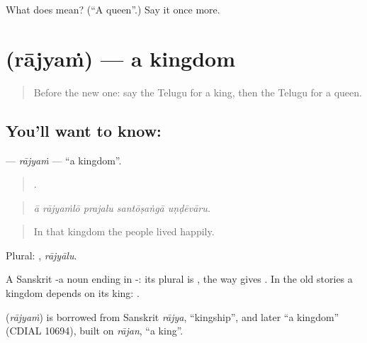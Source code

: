 \begin{tcolorbox}[breakable,colback=teal!4,colframe=teal!35!black,title={Before you move on}]
What does  mean? (\textquotedblleft{}A queen\textquotedblright{}.) Say it once more.
\end{tcolorbox}
\section[\texorpdfstring{\te{రాజ్యం} (rājyaṁ)}{రాజ్యం (rājyaṁ)}]{ (rājyaṁ) — a kingdom}

\label{lesson:TE-C327-rajyam}



\begin{quote}
Before the new one: say the Telugu for a king, then the Telugu for a queen.
\end{quote}

\subsection*{You'll want to know: }
\textbf{} — \emph{rājyaṁ} — \textquotedblleft{}a kingdom\textquotedblright{}.

\begin{quote}
    .
\end{quote}

\begin{quote}
\emph{ā rājyaṁlō prajalu santōṣaṅgā uṇḍēvāru.}
\end{quote}

\begin{quote}
In that kingdom the people lived happily.
\end{quote}

Plural: , \emph{rājyālu}.

A Sanskrit -a noun ending in -: its plural is , the way  gives . In the old stories a kingdom depends on its king:     .

\begin{cousinweb}
\textbf{} (\emph{rājyaṁ}) is borrowed from Sanskrit \emph{rājya}, \textquotedblleft{}kingship\textquotedblright{}, and later \textquotedblleft{}a kingdom\textquotedblright{} (CDIAL 10694), built on \emph{rājan}, \textquotedblleft{}a king\textquotedblright{}.
\end{cousinweb}


